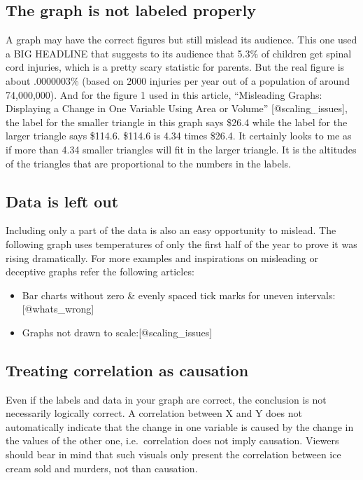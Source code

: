 \documentclass[]{book}
\providecommand{\tightlist}{%
  \setlength{\itemsep}{0pt}\setlength{\parskip}{0pt}}
\theoremstyle{definition}
\theoremstyle{definition}
\theoremstyle{definition}
\theoremstyle{remark}
\begin{document}
\subsection{The graph is not labeled
properly}\label{the-graph-is-not-labeled-properly}

A graph may have the correct figures but still mislead its audience.
This one used a BIG HEADLINE that suggests to its audience that 5.3\% of
children get spinal cord injuries, which is a pretty scary statistic for
parents. But the real figure is about .0000003\% (based on 2000 injuries
per year out of a population of around 74,000,000). And for the figure 1
used in this article, ``Misleading Graphs: Displaying a Change in One
Variable Using Area or Volume'' {[}@scaling\_issues{]}, the label for
the smaller triangle in this graph says \$26.4 while the label for the
larger triangle says \$114.6. \$114.6 is 4.34 times \$26.4. It certainly
looks to me as if more than 4.34 smaller triangles will fit in the
larger triangle. It is the altitudes of the triangles that are
proportional to the numbers in the labels.

\subsection{Data is left out}\label{data-is-left-out}

Including only a part of the data is also an easy opportunity to
mislead. The following graph uses temperatures of only the first half of
the year to prove it was rising dramatically. For more examples and
inspirations on misleading or deceptive graphs refer the following
articles:

\begin{itemize}
\tightlist
\item
  Bar charts without zero \& evenly spaced tick marks for uneven
  intervals: {[}@whats\_wrong{]}
\item
  Graphs not drawn to scale:{[}@scaling\_issues{]}
\end{itemize}

\subsection{Treating correlation as
causation}\label{treating-correlation-as-causation}

Even if the labels and data in your graph are correct, the conclusion is
not necessarily logically correct. A correlation between X and Y does
not automatically indicate that the change in one variable is caused by
the change in the values of the other one, i.e.~correlation does not
imply causation. Viewers should bear in mind that such visuals only
present the correlation between ice cream sold and murders, not than
causation.
\end{document}
